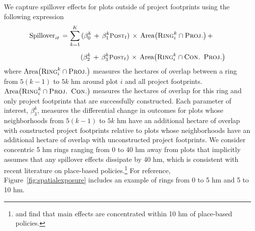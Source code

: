 \documentclass[12pt]{article}
\begin{document}
We capture spillover effects for plots outside of project footprints using the following expression
\begin{align}
\begin{split}
\text{Spillover}_{it} \,=\, &\sum_{k=1}^{K} \, (\beta_{0}^{k} \,+\, \beta_{1}^{k} \textsc{\small Post}_{t})  \, \times \, \text{Area}\big(\textsc{Ring}_i^{k}  \cap  \textsc{Proj.}\big) \, + \\[.5em]
&\hspace{1.7em}(\beta_{2}^{k} \,+\, \beta_{3}^{k} \textsc{\small Post}_{t})  \, \times \,\text{Area}\big(\textsc{Ring}_i^{k}  \cap \textsc{Con. Proj.}\big)
\end{split}
\end{align}
\noindent where $\text{Area}\big(\textsc{Ring}_i^{k}  \cap  \textsc{Proj.}\big)$ measures the  hectares of overlap between a ring from $5(k-1)$ to $5k$ hm around plot $i$ and all project footprints.   $\text{Area}\big(\textsc{Ring}_i^{k}  \cap  \textsc{Proj. Con.}\big)$ measures the hectares of overlap for this ring and only project footprints that are successfully constructed.  Each parameter of interest, $\beta_3^{k}$, measures the differential change in outcomes for plots whose neighborhoods from $5(k-1)$ to $5k$ hm have an additional hectare of overlap with constructed project footprints relative to plots whose neighborhoods have an additional hectare of overlap with unconstructed project footprints.  We consider concentric 5 hm rings ranging from 0 to 40 hm away from plots that implicitly assumes that any spillover effects dissipate by 40 hm, which is consistent with recent literature on place-based policies.\footnote{\cite{diamond2019wants} and \cite{rossi2010housing} find that main effects are concentrated within 10 hm of place-based policies.}   For reference, Figure~\ref{fig:spatialexposure} includes an example of rings from 0 to 5 hm and 5 to 10 hm.
\end{document}
